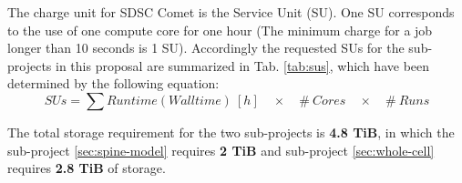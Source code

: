 The charge unit for SDSC Comet is the Service Unit (SU). One SU corresponds to the use of one compute
core for one hour (The minimum charge for a job longer than 10 seconds is 1 SU). Accordingly the
 requested SUs for the sub-projects in this proposal are summarized in Tab. \ref{tab:sus}, which 
have been determined by the following equation: $$SUs = \sum Runtime (Wall time)~[h]\quad \times\quad \#~Cores\quad \times\quad \#~Runs$$

The total storage requirement for the two sub-projects is \textbf{4.8 TiB}, in which the 
sub-project \ref{sec:spine-model} requires \textbf{2 TiB} and sub-project \ref{sec:whole-cell} requires \textbf{2.8 TiB} of storage.

\begin{table}
\caption{Total number of anticipated SUs on SDSC Comet for the two requested sub-projects 
as outlined in sections \ref{sec:spine-model}, \ref{sec:whole-cell}.}
\label{tab:sus}
\end{table}
